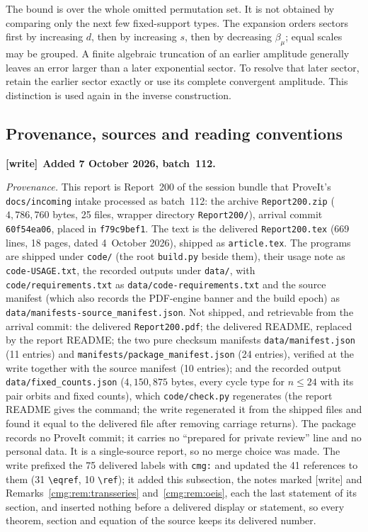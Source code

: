 \documentclass[11pt,letterpaper]{article}
\numberwithin{equation}{section}
\theoremstyle{definition}\newtheorem{definition}[theorem]{Definition}
\theoremstyle{remark}\newtheorem{remark}[theorem]{Remark}
\newcommand{\file}[1]{\nolinkurl{#1}}
\newenvironment{writenote}[1][]{\par\smallskip\begingroup\small
 \noindent\textbf{[write]}\if\relax\detokenize{#1}\relax\else~\textbf{#1.}\fi\ }%
 {\par\endgroup\smallskip}
\begin{document}
The bound is over the whole omitted permutation set. It is not obtained by comparing only the next few fixed-support types. The expansion orders sectors first by increasing $d$, then by increasing $s$, then by decreasing $\beta_\mu$; equal scales may be grouped. A finite algebraic truncation of an earlier amplitude generally leaves an error larger than a later exponential sector. To resolve that later sector, retain the earlier sector exactly or use its complete convergent amplitude. This distinction is used again in the inverse construction.

\subsection{Provenance, sources and reading conventions}\label{cmg:sec:provenance}
\begin{writenote}[Added 7 October 2026, batch~112]\raggedright
\emph{Provenance.} This report is Report~200 of the session bundle that
ProveIt's \file{docs/incoming} intake processed as batch~112: the archive
\file{Report200.zip} ($4{,}786{,}760$ bytes, 25 files, wrapper directory
\file{Report200/}), arrival commit \file{60f54ea06}, placed in
\file{f79c9bef1}. The text is the delivered \file{Report200.tex} (669 lines,
18 pages, dated 4~October 2026), shipped as \file{article.tex}. The programs
are shipped under \file{code/} (the root \file{build.py} beside them), their
usage note as \file{code-USAGE.txt}, the recorded outputs under \file{data/},
with \file{code/requirements.txt} as \file{data/code-requirements.txt} and the
source manifest (which also records the PDF-engine banner and the build epoch)
as \file{data/manifests-source_manifest.json}. Not shipped, and retrievable
from the arrival commit: the delivered \file{Report200.pdf}; the delivered
README, replaced by the report README; the two pure checksum manifests
\file{data/manifest.json} (11 entries) and
\file{manifests/package_manifest.json} (24 entries), verified at the write
together with the source manifest (10 entries); and the recorded output
\file{data/fixed_counts.json} ($4{,}150{,}875$ bytes, every cycle type for
$n\le24$ with its pair orbits and fixed counts), which \file{code/check.py}
regenerates (the report README gives the command; the write regenerated it from
the shipped files and found it equal to the delivered file after removing
carriage returns). The package records no ProveIt commit; it carries no
``prepared for private review'' line and no personal data. It is a
single-source report, so no merge choice was made. The write prefixed the 75
delivered labels with \file{cmg:} and updated the 41 references to them (31
\verb|\eqref|, 10 \verb|\ref|); it added this subsection, the notes marked
[write] and Remarks~\ref{cmg:rem:transseries} and~\ref{cmg:rem:oeis}, each the
last statement of its section, and inserted nothing before a delivered display
or statement, so every theorem, section and equation of the source keeps its
delivered number.


\end{writenote}
\end{document}

